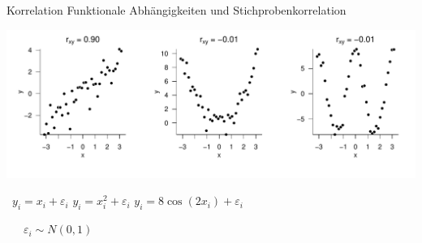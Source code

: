 \documentclass[
  8pt,
  ignorenonframetext,
]{beamer}
\begin{document}
\begin{frame}{Korrelation}
\protect\hypertarget{korrelation-7}{}
Funktionale Abhängigkeiten und Stichprobenkorrelation

\vspace{1cm}

\begin{center}\includegraphics[width=1\linewidth]{7_Abbildungen/mvda_7_rlinearitaet} \end{center}
\vspace{-5mm}

\(\,\) \hspace{1cm} \(y_i = x_i + \varepsilon_i\) \hspace{1.9cm}
\(y_i = x_i^2 + \varepsilon_i\) \hspace{1.2cm}
\(y_i = 8 \cos(2x_i) + \varepsilon_i\)

\center

\(\quad\,\,\,\varepsilon_i \sim N(0,1)\)
\end{frame}
\end{document}
